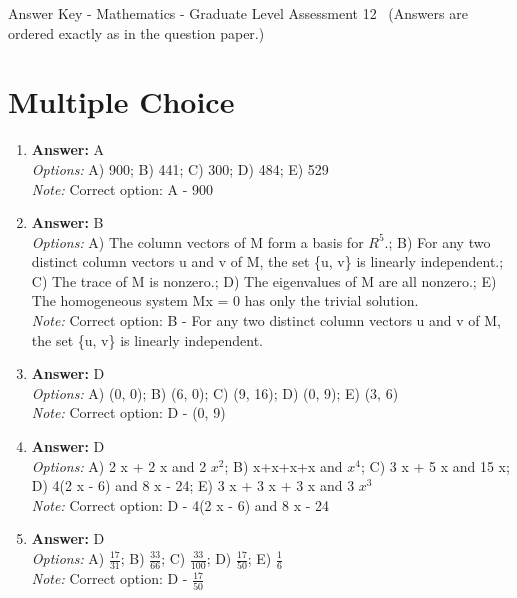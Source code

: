 \documentclass[12pt]{article}
\begin{document}
\begin{center}
Answer Key - Mathematics - Graduate Level Assessment 12 \
\small (Answers are ordered exactly as in the question paper.)
\end{center}

\section*{Multiple Choice}
\begin{enumerate}[label=\arabic*.]
\item \textbf{Answer:} A
\\ \textit{Options:} A) 900; B) 441; C) 300; D) 484; E) 529
\\ \textit{Note:} Correct option: A - 900
\item \textbf{Answer:} B
\\ \textit{Options:} A) The column vectors of M form a basis for $R^5$.; B) For any two distinct column vectors u and v of M, the set \{u, v\} is linearly independent.; C) The trace of M is nonzero.; D) The eigenvalues of M are all nonzero.; E) The homogeneous system Mx = 0 has only the trivial solution.
\\ \textit{Note:} Correct option: B - For any two distinct column vectors u and v of M, the set \{u, v\} is linearly independent.
\item \textbf{Answer:} D
\\ \textit{Options:} A) (0, 0); B) (6, 0); C) (9, 16); D) (0, 9); E) (3, 6)
\\ \textit{Note:} Correct option: D - (0, 9)
\item \textbf{Answer:} D
\\ \textit{Options:} A) 2 x + 2 x and 2 $x^2$; B) x+x+x+x and $x^4$; C) 3 x + 5 x and 15 x; D) 4(2 x - 6) and 8 x - 24; E) 3 x + 3 x + 3 x and 3 $x^3$
\\ \textit{Note:} Correct option: D - 4(2 x - 6) and 8 x - 24
\item \textbf{Answer:} D
\\ \textit{Options:} A) \ensuremath{\frac{17}{31}}; B) \ensuremath{\frac{33}{66}}; C) \ensuremath{\frac{33}{100}}; D) \ensuremath{\frac{17}{50}}; E) \ensuremath{\frac{1}{6}}
\\ \textit{Note:} Correct option: D - \ensuremath{\frac{17}{50}}
\end{enumerate}
\end{document}
